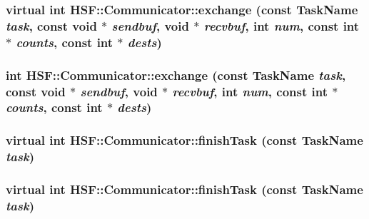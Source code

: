 \label{classHSF_1_1Communicator_a9459ed3c5350a046e5ab91ae329e650b}
\hypertarget{classHSF_1_1Communicator_a9459ed3c5350a046e5ab91ae329e650b}{
\subsubsection[{exchange}]{\setlength{\rightskip}{0pt plus 5cm}virtual int HSF::Communicator::exchange (const {\bf TaskName} {\em task}, \/  const void $\ast$ {\em sendbuf}, \/  void $\ast$ {\em recvbuf}, \/  int {\em num}, \/  const int $\ast$ {\em counts}, \/  const int $\ast$ {\em dests})}}
\label{classHSF_1_1Communicator_a9459ed3c5350a046e5ab91ae329e650b}
\hypertarget{classHSF_1_1Communicator_a71edf40d99144d1f73fe62a9ece81b1c}{
\subsubsection[{exchange}]{\setlength{\rightskip}{0pt plus 5cm}int HSF::Communicator::exchange (const {\bf TaskName} {\em task}, \/  const void $\ast$ {\em sendbuf}, \/  void $\ast$ {\em recvbuf}, \/  int {\em num}, \/  const int $\ast$ {\em counts}, \/  const int $\ast$ {\em dests})}}
\label{classHSF_1_1Communicator_a71edf40d99144d1f73fe62a9ece81b1c}
\hypertarget{classHSF_1_1Communicator_afd2efabdf9dc5461641311337c36b12f}{
\subsubsection[{finishTask}]{\setlength{\rightskip}{0pt plus 5cm}virtual int HSF::Communicator::finishTask (const {\bf TaskName} {\em task})}}
\label{classHSF_1_1Communicator_afd2efabdf9dc5461641311337c36b12f}
\hypertarget{classHSF_1_1Communicator_afd2efabdf9dc5461641311337c36b12f}{
\subsubsection[{finishTask}]{\setlength{\rightskip}{0pt plus 5cm}virtual int HSF::Communicator::finishTask (const {\bf TaskName} {\em task})}}
